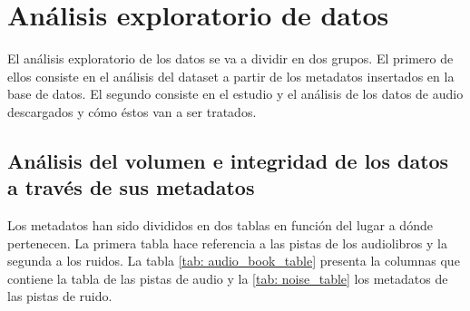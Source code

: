 \chapter{Análisis exploratorio de datos}\label{cp: eda}
El análisis exploratorio de los datos se va a dividir en dos grupos. El primero de ellos consiste en el análisis del dataset a partir de los metadatos insertados en la base de datos. El segundo consiste en el estudio y el análisis de los datos de audio descargados y cómo éstos van a ser tratados.

\section{Análisis del volumen e integridad de los datos a través de sus metadatos}
Los metadatos han sido divididos en dos tablas en función del lugar a dónde pertenecen. La primera tabla hace referencia a las pistas de los audiolibros y la segunda a los ruidos. La tabla \ref{tab: audio_book_table} presenta la columnas que contiene la tabla de las pistas de audio y la \ref{tab: noise_table} los metadatos de las pistas de ruido.

